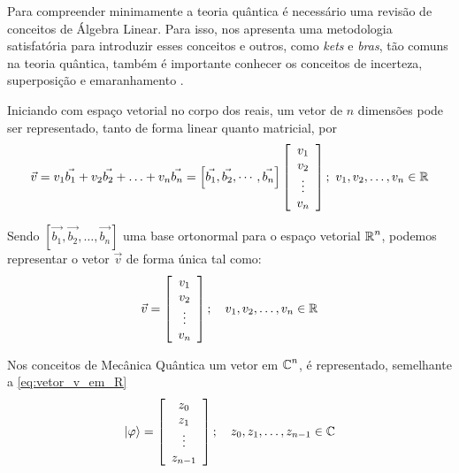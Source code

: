 Para compreender minimamente a teoria quântica é necessário uma revisão de conceitos de Álgebra Linear. Para isso, \textcite{Almeida2020} nos apresenta uma metodologia satisfatória para introduzir esses conceitos e outros, como \textit{kets} e \textit{bras}, tão comuns na teoria quântica, também é importante conhecer os conceitos de incerteza, superposição e emaranhamento \cite{hewitt2000fundamentos, mahon2000mecanica}. 

Iniciando com espaço vetorial no corpo dos reais, um vetor de $n$ dimensões pode ser representado, tanto de forma linear quanto matricial, por
$$
    \vec{v} = v_1\vec{b_1}+v_2\vec{b_2}+\ldots+v_n\vec{b_n}=\left[\vec{b_1}, \vec{b_2},\cdots, \vec{b_n}\right]\left[\begin{array}{c}
         v_1\\
         v_2\\ 
         \vdots\\
         v_n
    \end{array}\right];\ v_1, v_2,\ldots, v_n \in \operatorname{\mathbb{R}}
$$

Sendo $\left[\vec{b_1}, \vec{b_2},\dots, \vec{b_n}\right]$ uma base ortonormal para o espaço vetorial $\operatorname{\mathbb{R}}^n$, podemos representar o vetor $\vec{v}$ de forma única tal como:
\begin{equation}
    \label{eq:vetor_v_em_R}
    \vec{v}=\left[\begin{array}{c}
         v_1\\
         v_2\\ 
         \vdots\\
         v_n
    \end{array}\right];\quad v_1, v_2,\ldots, v_n \in \operatorname{\mathbb{R}}
\end{equation} 

Nos conceitos de Mecânica Quântica um vetor em $\operatorname{\mathbb{C}}^n$, é representado, semelhante a \autoref{eq:vetor_v_em_R}
$$
    \label{eq:vetor_em_C}
    \ket{\varphi} = \left[\begin{array}{c}
         z_0 \\
         z_1 \\
         \vdots \\
         z_{n-1}
    \end{array}\right];\quad z_0,z_1,\ldots, z_{n-1}\in\operatorname{\mathbb{C}}
$$

